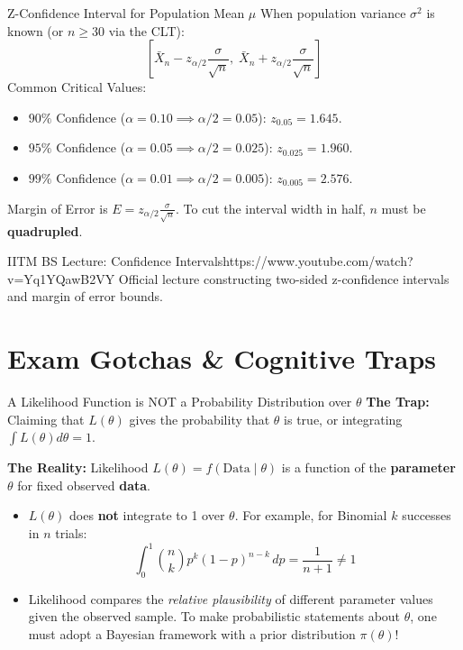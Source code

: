 \begin{formulabox}{Z-Confidence Interval for Population Mean $\mu$}
When population variance $\sigma^2$ is known (or $n \ge 30$ via the CLT):
$$\left[ \bar{X}_n - z_{\alpha/2} \frac{\sigma}{\sqrt{n}}, \; \bar{X}_n + z_{\alpha/2} \frac{\sigma}{\sqrt{n}} \right]$$
Common Critical Values:
\begin{itemize}
    \item $90\%$ Confidence ($\alpha = 0.10 \implies \alpha/2 = 0.05$): $z_{0.05} = 1.645$.
    \item $95\%$ Confidence ($\alpha = 0.05 \implies \alpha/2 = 0.025$): $z_{0.025} = 1.960$.
    \item $99\%$ Confidence ($\alpha = 0.01 \implies \alpha/2 = 0.005$): $z_{0.005} = 2.576$.
\end{itemize}
Margin of Error is $E = z_{\alpha/2} \frac{\sigma}{\sqrt{n}}$. To cut the interval width in half, $n$ must be \textbf{quadrupled}.
\end{formulabox}

\begin{videocard}{IITM BS Lecture: Confidence Intervals}{https://www.youtube.com/watch?v=Yq1YQawB2VY}
Official lecture constructing two-sided z-confidence intervals and margin of error bounds.
\end{videocard}

\section{Exam Gotchas \& Cognitive Traps}

\begin{trapbox}{A Likelihood Function is NOT a Probability Distribution over $\theta$}
\textbf{The Trap:} Claiming that $L(\theta)$ gives the probability that $\theta$ is true, or integrating $\int L(\theta) d\theta = 1$.

\textbf{The Reality:} Likelihood $L(\theta) = f(\text{Data} \mid \theta)$ is a function of the \textbf{parameter} $\theta$ for fixed observed \textbf{data}.
\begin{itemize}
    \item $L(\theta)$ does \textbf{not} integrate to 1 over $\theta$. For example, for Binomial $k$ successes in $n$ trials:
    $$\int_0^1 \binom{n}{k} p^k (1-p)^{n-k} \, dp = \frac{1}{n + 1} \neq 1$$
    \item Likelihood compares the \emph{relative plausibility} of different parameter values given the observed sample. To make probabilistic statements about $\theta$, one must adopt a Bayesian framework with a prior distribution $\pi(\theta)$!
\end{itemize}
\end{trapbox}

